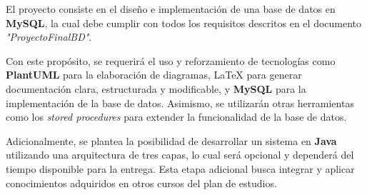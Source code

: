 
El proyecto consiste en el diseño e implementación de una base de datos en \textbf{MySQL}, la cual debe cumplir con todos los requisitos descritos en el documento \textit{"ProyectoFinalBD"}. 

Con este propósito, se requerirá el uso y reforzamiento de tecnologías como \textbf{PlantUML} para la elaboración de diagramas, \LaTeX{} para generar documentación clara, estructurada y modificable, y \textbf{MySQL} para la implementación de la base de datos. Asimismo, se utilizarán otras herramientas como los \textit{stored procedures} para extender la funcionalidad de la base de datos.

Adicionalmente, se plantea la posibilidad de desarrollar un sistema en \textbf{Java} utilizando una arquitectura de tres capas, lo cual será opcional y dependerá del tiempo disponible para la entrega. Esta etapa adicional busca integrar y aplicar conocimientos adquiridos en otros cursos del plan de estudios.
